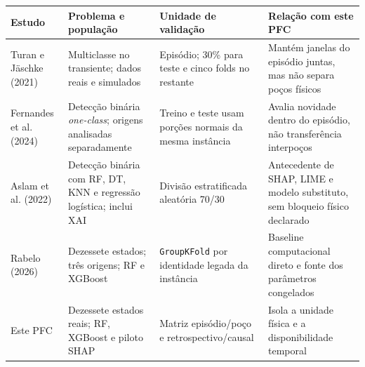 \begin{tabularx}{\textwidth}{@{}p{2.2cm}X X X@{}}
\toprule
Estudo & Problema e população & Unidade de validação & Relação com este PFC \\
\midrule
Turan e Jäschke (2021) & Multiclasse no transiente; dados reais e simulados & Episódio; 30\% para teste e cinco folds no restante & Mantém janelas do episódio juntas, mas não separa poços físicos \\
Fernandes et al. (2024) & Detecção binária \emph{one-class}; origens analisadas separadamente & Treino e teste usam porções normais da mesma instância & Avalia novidade dentro do episódio, não transferência interpoços \\
Aslam et al. (2022) & Detecção binária com RF, DT, KNN e regressão logística; inclui XAI & Divisão estratificada aleatória 70/30 & Antecedente de SHAP, LIME e modelo substituto, sem bloqueio físico declarado \\
Rabelo (2026) & Dezessete estados; três origens; RF e XGBoost & \texttt{GroupKFold} por identidade legada da instância & Baseline computacional direto e fonte dos parâmetros congelados \\
Este PFC & Dezessete estados reais; RF, XGBoost e piloto SHAP & Matriz episódio/poço e retrospectivo/causal & Isola a unidade física e a disponibilidade temporal \\
\bottomrule
\end{tabularx}
